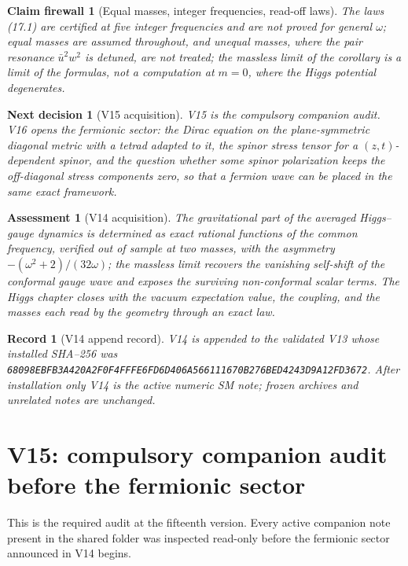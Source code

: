 \documentclass[11pt]{article}
\newtheorem{firewall}[theorem]{Claim firewall}
\newtheorem{decision}[theorem]{Next decision}
\newtheorem{assessment}[theorem]{Assessment}
\newtheorem{record}[theorem]{Record}
\theoremstyle{remark}
\begin{document}
\begin{firewall}[Equal masses, integer frequencies, read-off laws]
\label{fire:v20v14}
The laws (17.1) are certified at five integer frequencies and are not
proved for general \(\omega\); equal masses are assumed throughout,
and unequal masses, where the pair resonance \(\bar u^2w^2\) is
detuned, are not treated; the massless limit of the corollary is a
limit of the formulas, not a computation at \(m=0\), where the Higgs
potential degenerates.
\end{firewall}

\begin{decision}[V15 acquisition]
\label{dec:v20v14-next}
V15 is the compulsory companion audit.  V16 opens the fermionic
sector: the Dirac equation on the plane-symmetric diagonal metric
with a tetrad adapted to it, the spinor stress tensor for a
\((z,t)\)-dependent spinor, and the question whether some spinor
polarization keeps the off-diagonal stress components zero, so that a
fermion wave can be placed in the same exact framework.
\end{decision}

\begin{assessment}[V14 acquisition]
\label{ass:v20v14}
The gravitational part of the averaged Higgs--gauge dynamics is
determined as exact rational functions of the common frequency,
verified out of sample at two masses, with the asymmetry
\(-(\omega^2+2)/(32\omega)\); the massless limit recovers the
vanishing self-shift of the conformal gauge wave and exposes the
surviving non-conformal scalar terms.  The Higgs chapter closes with
the vacuum expectation value, the coupling, and the masses each read
by the geometry through an exact law.
\end{assessment}

\begin{record}[V14 append record]
\label{rec:v20v14}
V14 is appended to the validated V13 whose installed SHA--256 was
\texttt{68098EBFB3A420A2F0F4FFFE6FD6D406A566111670B276BED4243D9A12FD3672}.
After installation only V14 is the active numeric SM note; frozen
archives and unrelated notes are unchanged.
\end{record}


\section{V15: compulsory companion audit before the fermionic sector}
\label{sec:v20v15}

This is the required audit at the fifteenth version.  Every active
companion note present in the shared folder was inspected read-only
before the fermionic sector announced in V14 begins.
\end{document}
